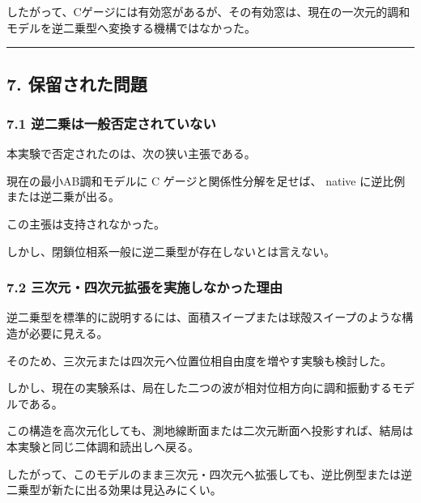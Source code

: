 \documentclass[
]{article}
\newenvironment{Shaded}{}{}
\newcommand{\NormalTok}[1]{#1}
\begin{document}
したがって、Cゲージには有効窓があるが、その有効窓は、現在の一次元的調和モデルを逆二乗型へ変換する機構ではなかった。

\begin{center}\rule{0.5\linewidth}{0.5pt}\end{center}

\subsection{7.
保留された問題}\label{ux4fddux7559ux3055ux308cux305fux554fux984c}

\subsubsection{7.1
逆二乗は一般否定されていない}\label{ux9006ux4e8cux4e57ux306fux4e00ux822cux5426ux5b9aux3055ux308cux3066ux3044ux306aux3044}

本実験で否定されたのは、次の狭い主張である。

\begin{Shaded}
\begin{Highlighting}[]
\NormalTok{現在の最小AB調和モデルに C ゲージと関係性分解を足せば、}
\NormalTok{native に逆比例または逆二乗が出る。}
\end{Highlighting}
\end{Shaded}

この主張は支持されなかった。

しかし、閉鎖位相系一般に逆二乗型が存在しないとは言えない。

\subsubsection{7.2
三次元・四次元拡張を実施しなかった理由}\label{ux4e09ux6b21ux5143ux56dbux6b21ux5143ux62e1ux5f35ux3092ux5b9fux65bdux3057ux306aux304bux3063ux305fux7406ux7531}

逆二乗型を標準的に説明するには、面積スイープまたは球殻スイープのような構造が必要に見える。

そのため、三次元または四次元へ位置位相自由度を増やす実験も検討した。

しかし、現在の実験系は、局在した二つの波が相対位相方向に調和振動するモデルである。

この構造を高次元化しても、測地線断面または二次元断面へ投影すれば、結局は本実験と同じ二体調和読出しへ戻る。

したがって、このモデルのまま三次元・四次元へ拡張しても、逆比例型または逆二乗型が新たに出る効果は見込みにくい。
\end{document}
